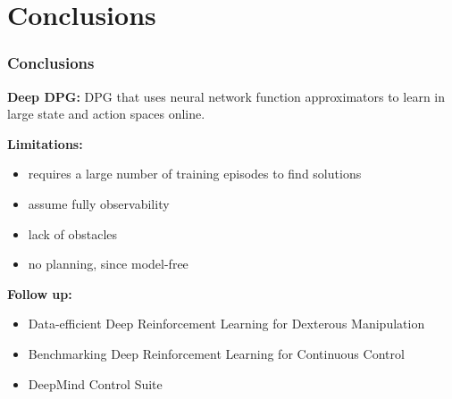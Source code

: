 \section{Conclusions}

\begin{frame}
\frametitle{Conclusions}
\textbf{Deep DPG:} DPG that uses neural network function approximators to
learn in large state and action spaces online.
\vspace{3mm}

\textbf{Limitations:}
\begin{itemize}
  \item requires a large number of training episodes to find solutions
  \item assume fully observability
  \item lack of obstacles
  \item no planning, since model-free
\end{itemize}
\vspace{3mm}

\textbf{Follow up:}
\begin{itemize}
\item {\footnotesize Data-efficient Deep Reinforcement Learning for Dexterous Manipulation}
\item Benchmarking Deep Reinforcement Learning for Continuous Control
\item DeepMind Control Suite
\end{itemize}

\end{frame}

